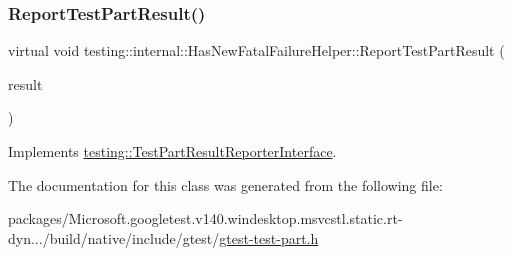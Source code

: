 \mbox{\label{classtesting_1_1internal_1_1_has_new_fatal_failure_helper_ac7b5e77c9847b2b057cb97193ba82441}} 
\subsubsection{\texorpdfstring{ReportTestPartResult()}{ReportTestPartResult()}}
{\footnotesize\ttfamily virtual void testing\+::internal\+::\+Has\+New\+Fatal\+Failure\+Helper\+::\+Report\+Test\+Part\+Result (\begin{DoxyParamCaption}\item[{const \mbox{\hyperlink{classtesting_1_1_test_part_result}{Test\+Part\+Result}} \&}]{result }\end{DoxyParamCaption})\hspace{0.3cm}{\ttfamily [virtual]}}



Implements \mbox{\hyperlink{classtesting_1_1_test_part_result_reporter_interface_aa2f920e7a5a0a6d0faf19e3727928c22}{testing\+::\+Test\+Part\+Result\+Reporter\+Interface}}.



The documentation for this class was generated from the following file\+:\begin{DoxyCompactItemize}
\item 
packages/\+Microsoft.\+googletest.\+v140.\+windesktop.\+msvcstl.\+static.\+rt-\/dyn.../build/native/include/gtest/\mbox{\hyperlink{gtest-test-part_8h}{gtest-\/test-\/part.\+h}}\end{DoxyCompactItemize}
